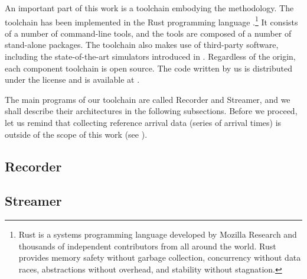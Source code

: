 An important part of this work is a toolchain embodying the methodology. The
toolchain has been implemented in the Rust programming language
\cite{rust}.\footnote{Rust is a systems programming language developed by
Mozilla Research and thousands of independent contributors from all around the
world. Rust provides memory safety without garbage collection, concurrency
without data races, abstractions without overhead, and stability without
stagnation.} It consists of a number of command-line tools, and the tools are
composed of a number of stand-alone packages. The toolchain also makes use of
third-party software, including the state-of-the-art simulators introduced in
. Regardless of the origin, each component toolchain is open
source. The code written by us is distributed under the  license
\cite{mit} and is available at \cite{sources}.

The main programs of our toolchain are called Recorder and Streamer, and we
shall describe their architectures in the following subsections. Before we
proceed, let us remind that collecting reference arrival data (series of arrival
times) is outside of the scope of this work (see ).

\subsection{Recorder} 


\subsection{Streamer} 

